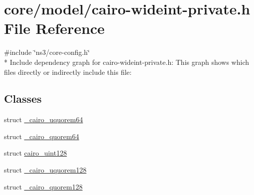 \hypertarget{cairo-wideint-private_8h}{}\section{core/model/cairo-\/wideint-\/private.h File Reference}
\label{cairo-wideint-private_8h}
{\ttfamily \#include \char`\"{}ns3/core-\/config.\+h\char`\"{}}\\*
Include dependency graph for cairo-\/wideint-\/private.h\+:
This graph shows which files directly or indirectly include this file\+:
\subsection*{Classes}
\begin{DoxyCompactItemize}
\item 
struct \hyperlink{struct__cairo__uquorem64}{\+\_\+cairo\+\_\+uquorem64}
\item 
struct \hyperlink{struct__cairo__quorem64}{\+\_\+cairo\+\_\+quorem64}
\item 
struct \hyperlink{structcairo__uint128}{cairo\+\_\+uint128}
\item 
struct \hyperlink{struct__cairo__uquorem128}{\+\_\+cairo\+\_\+uquorem128}
\item 
struct \hyperlink{struct__cairo__quorem128}{\+\_\+cairo\+\_\+quorem128}
\end{DoxyCompactItemize}
